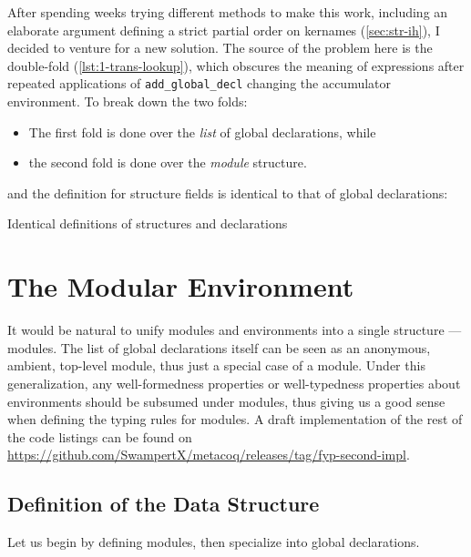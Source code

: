 After spending weeks trying different methods to make this work, including an
elaborate argument defining a strict partial order on kernames
(\ref{sec:str-ih}), I decided to venture for a new solution. The source of the
problem here is the double-fold (\ref{lst:1-trans-lookup}), which obscures the
meaning of expressions after repeated applications of \verb|add_global_decl|
changing the accumulator environment. To break down the two folds:

\begin{itemize}
  \item The first fold is done over the \emph{list} of global declarations,
  while
  \item the second fold is done over the \emph{module} structure.
\end{itemize}

and the definition for structure fields is identical to that of global
declarations: 

\begin{listing}[H]
  \caption{Identical definitions of structures and declarations}
  \label{lst:2-st-gd-id}
\end{listing}


\section{The Modular Environment}
\newcommand{\tcc}[3]{\inputminted[firstline={#1},lastline={#2},linenos]{Coq}{
  code/v2/template-coq/theories/#3}}
\newcommand{\pcuicc}[3]{\inputminted[firstline={#1},lastline={#2},linenos]{Coq}{
  code/v2/pcuic/theories/#3}}

It would be natural to unify modules and environments into a single structure
--- modules. The list of global declarations itself can be seen as an anonymous,
ambient, top-level module, thus just a special case of a module. Under this
generalization, any well-formedness properties or well-typedness properties
about environments should be subsumed under modules, thus giving us a good sense
when defining the typing rules for modules. A draft implementation of the rest
of the code listings can be found on
\url{https://github.com/SwampertX/metacoq/releases/tag/fyp-second-impl}.

\subsection{Definition of the Data Structure}
Let us begin by defining modules, then specialize into global declarations.


